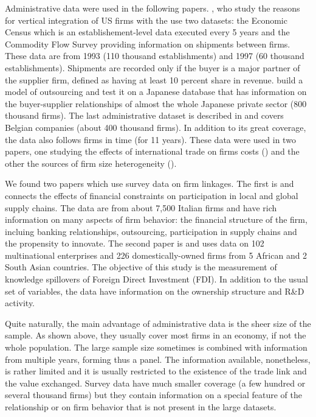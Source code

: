 \documentclass[final, dvipsnames, authoryear,12pt]{elsarticle}
\begin{document}
Administrative data were used in the following papers. \cite{atalay2014vertical}, who study the reasons for vertical integration of US firms with the use two datasets: the Economic Census which is an establishement-level data executed every 5 years and the Commodity Flow Survey providing information on shipments between firms. These data are from 1993 (110 thousand establishments) and 1997 (60 thousand establishments). Shipments are recorded only if the buyer is a major partner of the supplier firm, defined as having at least 10 percent share in revenue.  \cite{bernard2019production} build a model of outsourcing and test it on a Japanese database that has information on the buyer-supplier relationships of almost the whole Japanese private sector (800 thousand firms). The last administrative dataset is described in \cite{dhyne2015belgian} and covers Belgian companies (about 400 thousand firms). In addition to its great coverage, the data also follows firms in time (for 11 years). These data were used in two papers, one studying the effects of international trade on firms costs (\cite{tintelnot2018trade}) and the other the sources of firm size heterogeneity (\cite{bernard2019production}).

We found two papers which use survey data on firm linkages. The first is \cite{minetti2018financial} and connects the effects of financial constraints on participation in local and global supply chains. The data are from about 7,500 Italian firms and have rich information on many aspects of firm behavior: the financial structure of the firm, incluing banking relationships, outsourcing, participation in supply chains and the propensity to innovate. The second paper is \cite{newman2018linked} and uses data on 102 multinational enterprises and 226 domestically-owned firms from 5 African and 2 South Asian countries. The objective of this study is the measurement of knowledge spillovers of Foreign Direct Investment (FDI). In addition to the usual set of variables, the data have information on the ownership structure and R&D activity.

Quite naturally, the main advantage of administrative data is the sheer size of the sample. As shown above, they usually cover most firms in an economy, if not the whole population. The large sample size sometimes is combined with information from multiple years, forming thus a panel. The information available, nonetheless, is rather limited and it is usually restricted to the existence of the trade link and the value exchanged. Survey data have much smaller coverage (a few hundred or several thousand firms) but they contain information on a special feature of the relationship or on firm behavior that is not present in the large datasets.
\end{document}
